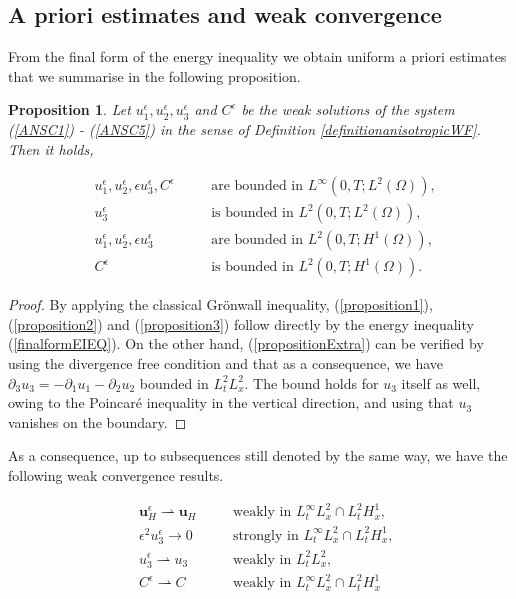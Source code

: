 \documentclass[11pt]{article}
\newtheorem{prop}{Proposition}
\begin{document}
\subsection{A priori estimates and weak convergence}

From the final form of the energy inequality we obtain uniform a priori estimates that we summarise in the following proposition.

\begin{prop}
Let $u^\epsilon_1, u^\epsilon_2, u^\epsilon_3$ and $C^\epsilon$ be the weak solutions of the system (\ref{ANSC1}) - (\ref{ANSC5}) in the sense of Definition \ref{definitionanisotropicWF}. Then it holds,

\begin{align}
& u^\epsilon_1, u^\epsilon_2, \epsilon u^\epsilon_3, C^\epsilon & \quad & \text{are bounded in $L^\infty (0,T; L^2(\Omega)),$} \label{proposition1} \\
& u^\epsilon_3 & \quad & \text{is bounded in $L^2 (0,T; L^2(\Omega)),$} \label{propositionExtra} \\
& u^\epsilon_1, u^\epsilon_2, \epsilon u^\epsilon_3 & \quad & \text{are bounded in $L^2(0,T; H^1(\Omega)),$} \label{proposition2} \\
& C^\epsilon & \quad & \text{is bounded in $L^2(0,T;H^1(\Omega)).$} \label{proposition3}
\end{align}

\end{prop}

\begin{proof}
By applying the classical Gr\"onwall inequality, (\ref{proposition1}), (\ref{proposition2}) and (\ref{proposition3}) follow directly by the energy inequality (\ref{finalformEIEQ}). On the other hand, (\ref{propositionExtra}) can be verified by using the divergence free condition and that as a consequence, we have $\partial_3 u_3 = - \partial_1 u_1 - \partial_2 u_2$ bounded in $L^2_t L^2 _x$. The bound holds for $u_3$ itself as well, owing to the Poincar\'e inequality in the vertical direction, and using that $u_3$ vanishes on the boundary.
\end{proof}

As a consequence, up to subsequences still denoted by the same way, we have the following weak convergence results.

\begin{align} 
& \mathbf{u}_H^\epsilon \rightharpoonup \mathbf{u}_H &\quad & \text{weakly in $L_t^\infty L_x^2 \cap L_t^2 H_x^1$,} \label{WeakConvUHEps} \\
& \epsilon^2 u_3^\epsilon \to 0 &\quad & \text{strongly in $L_t^\infty L_x^2 \cap L_t^2 H_x^1$,} \label{WeakConvU3Eps} \\ 
& u_3^\epsilon \rightharpoonup u_3 &\quad & \text{weakly in $L_t^2 L_x^2$,} \label{WeakConvU3NoEps} \\
& C^\epsilon \rightharpoonup C &\quad & \text{weakly in $L_t^\infty L_x^2 \cap L_t^2 H_x^1$} \label{WeakConvCEps1}
\end{align} 
\end{document}
